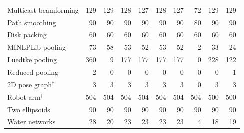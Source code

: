 \documentclass[pdflatex,sn-mathphys-num]{sn-jnl}
\theoremstyle{thmstyleone}
\theoremstyle{thmstylethree}
\newenvironment{scaledtable}[1][tbp]{\begin{tableorg}[#1]\centering}{\end{tableorg}}
\begin{document}
\begin{scaledtable}[!htbp]
{\begin{tabular}{@{}lrrrrrrrrr@{}}
Multicast beamforming & 129 & 129 & 128 & 127 & 128 & 127 & 72 & 129 & 129 \\
Path smoothing & 90 & 90 & 90 & 90 & 90 & 90 & 80 & 90 & 90 \\
Disk packing & 60 & 60 & 60 & 60 & 60 & 60 & 60 & 60 & 60 \\
MINLPLib pooling & 73 & 58 & 53 & 52 & 53 & 52 & 2 & 33 & 24 \\
Luedtke pooling & 360 & 9 & 177 & 177 & 177 & 177 & 0 & 228 & 122 \\
Reduced pooling & 2 & 0 & 0 & 0 & 0 & 0 & 0 & 0 & 1 \\
2D pose graph$^\dagger$ & 3 & 3 & 3 & 3 & 3 & 3 & 0 & 3 & 3 \\
Robot arm$^\dagger$ & 504 & 504 & 504 & 504 & 504 & 504 & 504 & 500 & 500 \\
Two ellipsoids & 90 & 90 & 90 & 90 & 90 & 90 & 90 & 90 & 90 \\
Water networks & 28 & 20 & 23 & 23 & 23 & 23 & 4 & 18 & 19 \\
\bottomrule
\end{tabular}

}
\end{scaledtable}
\end{document}
